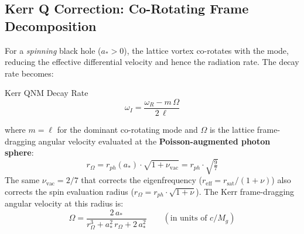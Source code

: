 \subsection{Kerr Q Correction: Co-Rotating Frame Decomposition}
\label{sec:kerr_q_correction}

For a \textit{spinning} black hole ($a_* > 0$), the lattice vortex co-rotates with the mode, reducing the effective differential velocity and hence the radiation rate. The decay rate becomes:
\begin{resultbox}{Kerr QNM Decay Rate}
\begin{equation}
    \boxed{\omega_I = \frac{\omega_R - m\,\Omega}{2\,\ell}}
    \label{eq:kerr_q}
\end{equation}
\end{resultbox}
\noindent where $m = \ell$ for the dominant co-rotating mode and $\Omega$ is the lattice frame-dragging angular velocity evaluated at the \textbf{Poisson-augmented photon sphere}:
\begin{equation}
    r_\Omega = r_{ph}(a_*) \cdot \sqrt{1 + \nu_\mathrm{vac}} = r_{ph} \cdot \sqrt{\tfrac{9}{7}}
    \label{eq:r_omega}
\end{equation}
The same $\nu_\mathrm{vac} = 2/7$ that corrects the eigenfrequency ($r_\mathrm{eff} = r_\mathrm{sat}/(1+\nu)$) also corrects the spin evaluation radius ($r_\Omega = r_{ph} \cdot \sqrt{1+\nu}$). The Kerr frame-dragging angular velocity at this radius is:
\begin{equation}
    \Omega = \frac{2\,a_*}{r_\Omega^3 + a_*^2\,r_\Omega + 2\,a_*^2}
    \qquad (\text{in units of } c/M_g)
\end{equation}

